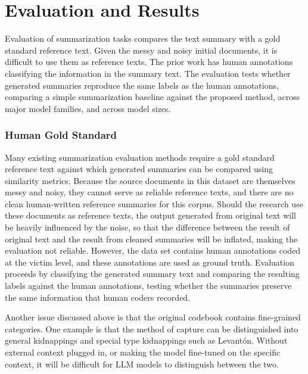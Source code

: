 \documentclass{article}
\begin{document}
\section{Evaluation and Results}\label{eval_results}

Evaluation of summarization tasks compares the
text summary with a gold standard reference text. Given the messy and noisy initial documents, it is difficult to
use them as reference texts.  The prior work has human
annotations classifying the information in the 
summary text. The evaluation tests whether generated summaries reproduce
the same labels as the human annotations, comparing a simple
summarization baseline against the proposed method, across major model
families, and across model sizes.

\subsubsection{Human Gold Standard}\label{human-gold-standard}

Many existing summarization evaluation methods require a gold standard reference text against which generated summaries can be compared using similarity metrics. Because the source documents in this dataset are themselves messy and noisy, they cannot serve as reliable reference texts, and there are no clean human-written reference summaries for this corpus. Should the research use these documents as reference texts, the output generated from original text will be heavily influenced by the noise, so that the difference between the result of original text and the result from cleaned summaries will be inflated, making the evaluation not reliable. However, the data set contains human annotations coded at the victim level, and these annotations are used as ground truth. Evaluation proceeds by classifying the generated summary text and comparing the resulting labels against the human annotations, testing whether the summaries preserve the same information that human coders recorded. 

Another issue discussed above is that the original codebook contains fine-grained categories. One example is that the method of capture can be distinguished into general kidnappings and special type kidnappings such as Levantón. Without external context plugged in, or making the model fine-tuned on the specific context, it will be difficult for LLM models to distinguish between the two.
\end{document}
